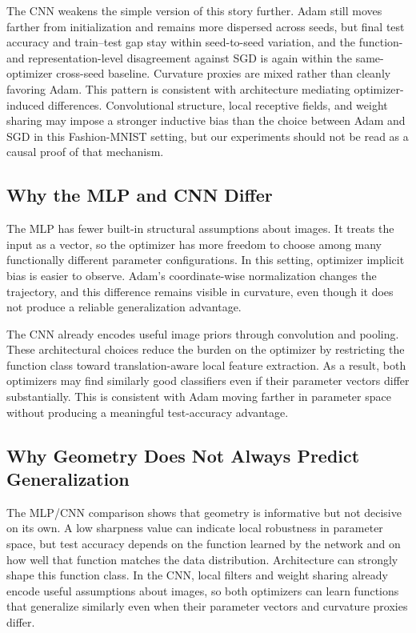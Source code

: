 \documentclass[11pt]{article}
\begin{document}
The CNN weakens the simple version of this story further. Adam still moves farther from initialization and remains more dispersed across seeds, but final test accuracy and train--test gap stay within seed-to-seed variation, and the function- and representation-level disagreement against SGD is again within the same-optimizer cross-seed baseline. Curvature proxies are mixed rather than cleanly favoring Adam. This pattern is consistent with architecture mediating optimizer-induced differences. Convolutional structure, local receptive fields, and weight sharing may impose a stronger inductive bias than the choice between Adam and SGD in this Fashion-MNIST setting, but our experiments should not be read as a causal proof of that mechanism.

\subsection{Why the MLP and CNN Differ}

The MLP has fewer built-in structural assumptions about images. It treats the input as a vector, so the optimizer has more freedom to choose among many functionally different parameter configurations. In this setting, optimizer implicit bias is easier to observe. Adam's coordinate-wise normalization changes the trajectory, and this difference remains visible in curvature, even though it does not produce a reliable generalization advantage.

The CNN already encodes useful image priors through convolution and pooling. These architectural choices reduce the burden on the optimizer by restricting the function class toward translation-aware local feature extraction. As a result, both optimizers may find similarly good classifiers even if their parameter vectors differ substantially. This is consistent with Adam moving farther in parameter space without producing a meaningful test-accuracy advantage.

\subsection{Why Geometry Does Not Always Predict Generalization}

The MLP/CNN comparison shows that geometry is informative but not decisive on its own. A low sharpness value can indicate local robustness in parameter space, but test accuracy depends on the function learned by the network and on how well that function matches the data distribution. Architecture can strongly shape this function class. In the CNN, local filters and weight sharing already encode useful assumptions about images, so both optimizers can learn functions that generalize similarly even when their parameter vectors and curvature proxies differ.
\end{document}
